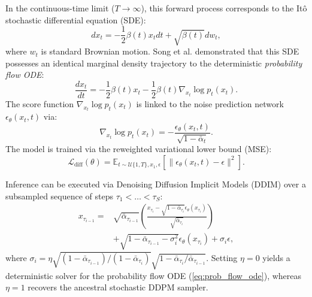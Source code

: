 \documentclass[conference]{IEEEtran}
\begin{document}
In the continuous-time limit ($T \to \infty$), this forward process corresponds to the It\^{o} stochastic differential equation (SDE):
\begin{equation}
dx_t = -\frac{1}{2} \beta(t) x_t dt + \sqrt{\beta(t)} dw_t,
\end{equation}
where $w_t$ is standard Brownian motion. Song et al. \cite{song2020score} demonstrated that this SDE possesses an identical marginal density trajectory to the deterministic \textit{probability flow ODE}:
\begin{equation}
\frac{dx_t}{dt} = -\frac{1}{2} \beta(t) x_t - \frac{1}{2} \beta(t) \nabla_{x_t} \log p_t(x_t).
\label{eq:prob_flow_ode}
\end{equation}
The score function $\nabla_{x_t} \log p_t(x_t)$ is linked to the noise prediction network $\epsilon_\theta(x_t, t)$ via:
\begin{equation}
\nabla_{x_t} \log p_t(x_t) = -\frac{\epsilon_\theta(x_t, t)}{\sqrt{1 - \bar{\alpha}_t}}.
\end{equation}
The model is trained via the reweighted variational lower bound (MSE):
\begin{equation}
\mathcal{L}_{\text{diff}}(\theta) = \mathbb{E}_{t \sim \mathcal{U}\{1, T\}, x_1, \epsilon} \left[ \|\epsilon_\theta(x_t, t) - \epsilon\|^2 \right].
\end{equation}

Inference can be executed via Denoising Diffusion Implicit Models (DDIM) \cite{song2020denoising} over a subsampled sequence of steps $\tau_1 < \dots < \tau_S$:
\begin{align}
x_{\tau_{i-1}} = &\sqrt{\bar{\alpha}_{\tau_{i-1}}} \left( \frac{x_{\tau_i} - \sqrt{1 - \bar{\alpha}_{\tau_i}} \epsilon_\theta(x_{\tau_i})}{\sqrt{\bar{\alpha}_{\tau_i}}} \right) \nonumber \\
&+ \sqrt{1 - \bar{\alpha}_{\tau_{i-1}} - \sigma_i^2} \epsilon_\theta(x_{\tau_i}) + \sigma_i \epsilon,
\end{align}
where $\sigma_i = \eta \sqrt{(1 - \bar{\alpha}_{\tau_{i-1}})/(1 - \bar{\alpha}_{\tau_i})} \sqrt{1 - \bar{\alpha}_{\tau_i}/\bar{\alpha}_{\tau_{i-1}}}$. Setting $\eta = 0$ yields a deterministic solver for the probability flow ODE (\ref{eq:prob_flow_ode}), whereas $\eta = 1$ recovers the ancestral stochastic DDPM sampler.
\end{document}
